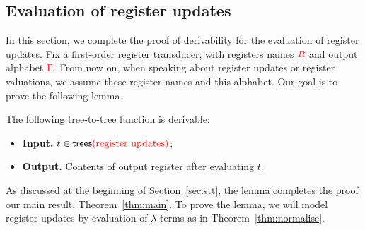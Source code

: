   
\subsection{Evaluation of register updates}
\label{sec:updates-endgame}
In this section, we complete the proof of derivability for the evaluation of register updates. Fix a first-order register transducer, with registers names ${{\color{red}{R}}}$ and output alphabet ${\color{red}{\Gamma}}$. From now on, when speaking about register updates or register valuations, we assume these register names and this alphabet. 
Our goal is to prove the following lemma. 
\begin{lemma}\label{lem:derive-register-updates}
    The  following tree-to-tree function  is derivable:
    \begin{itemize}
        \item {\bf Input.} $t \in \mathsf {trees}{{\color{red}{\text{(register updates)}}}}$;
        \item {\bf Output.} Contents of  output register after evaluating $t$.
    \end{itemize}
\end{lemma}As discussed at the beginning of  Section~\ref{sec:stt}, the lemma completes the proof  our main result, Theorem~\ref{thm:main}.  
To prove the lemma, we will model   register updates by evaluation of $\lambda$-terms as in Theorem~\ref{thm:normalise}. %

